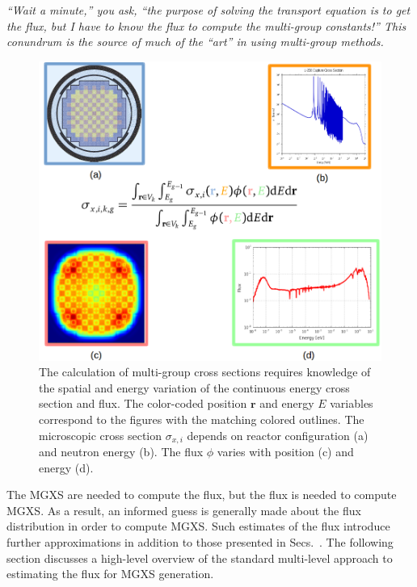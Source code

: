 \begin{displayquote}
\textit{``Wait a minute,'' you ask, ``the purpose of solving the transport equation is to get the flux, but I have to know the flux to compute the multi-group constants!'' This conundrum is the source of much of the ``art'' in using multi-group methods.}
\end{displayquote}

\begin{figure}[h!]
  \centering
  \includegraphics[width=0.9\linewidth]{figures/mgxs/mgxs-overlay}
\caption[Energy and spatial variation in \ac{MGXS}]{The calculation of multi-group cross sections requires knowledge of the spatial and energy variation of the continuous energy cross section and flux. The color-coded position $\mathbf{r}$ and energy $E$ variables correspond to the figures with the matching colored outlines. The microscopic cross section $\sigma_{x,i}$ depends on reactor configuration (a) and neutron energy (b). The flux $\phi$ varies with position (c) and energy (d).}
\label{fig:chap2-mgxs-overlay}
\end{figure}

The \ac{MGXS} are needed to compute the flux, but the flux is needed to compute \ac{MGXS}. As a result, an informed guess is generally made about the flux distribution in order to compute \ac{MGXS}. Such estimates of the flux introduce further approximations in addition to those presented in Secs.~. The following section discusses a high-level overview of the standard multi-level approach to estimating the flux for \ac{MGXS} generation.

